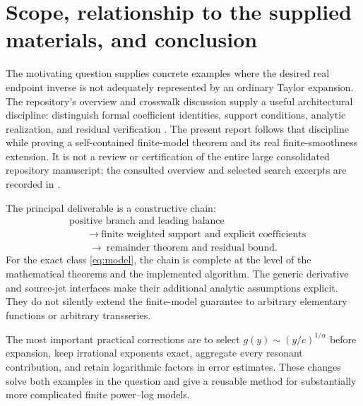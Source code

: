 \documentclass[11pt,a4paper]{article}
\numberwithin{equation}{section}
\theoremstyle{definition}\newtheorem{definition}[theorem]{Definition}
\theoremstyle{remark}\newtheorem{remark}[theorem]{Remark}
\newcommand{\code}[1]{\texttt{\detokenize{#1}}}
\begin{document}
\section{Scope, relationship to the supplied materials, and conclusion}
The motivating question supplies concrete examples where the desired real endpoint inverse is not adequately represented by an ordinary Taylor expansion. The repository's overview and crosswalk discussion supply a useful architectural discipline: distinguish formal coefficient identities, support conditions, analytic realization, and residual verification \cite{repo}. The present report follows that discipline while proving a self-contained finite-model theorem and its real finite-smoothness extension. It is not a review or certification of the entire large consolidated repository manuscript; the consulted overview and selected search excerpts are recorded in \code{SOURCES.md}.

The principal deliverable is a constructive chain:
\[
\begin{aligned}
&\text{positive branch and leading balance}\\
&\qquad\longrightarrow\ \text{finite weighted support and explicit coefficients}\\
&\qquad\longrightarrow\ \text{remainder theorem and residual bound}.
\end{aligned}
\]
For the exact class \eqref{eq:model}, the chain is complete at the level of the mathematical theorems and the implemented algorithm. The generic derivative and source-jet interfaces make their additional analytic assumptions explicit. They do not silently extend the finite-model guarantee to arbitrary elementary functions or arbitrary transseries.

The most important practical corrections are to select $g(y)\sim(y/c)^{1/\alpha}$ before expansion, keep irrational exponents exact, aggregate every resonant contribution, and retain logarithmic factors in error estimates. These changes solve both examples in the question and give a reusable method for substantially more complicated finite power--log models.

\appendix
\end{document}
